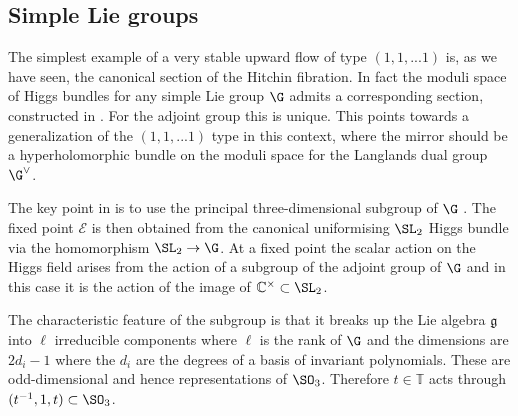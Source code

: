 \documentclass[12pt]{article}
\numberwithin{equation}{section}
\theoremstyle{remark}
\theoremstyle{definition}
\numberwithin{theorem}{section}
\newcommand{\lie}[1]{\mathfrak{#1}}
\def\C{\mathbb{C}}
\newcommand{\T}{{\mathbb{T}}}
\renewcommand{\1}{\mathbbm{1}}
\begin{document}
\subsection{Simple Lie groups}\label{simple}
The simplest example of a very stable upward flow of type $(1,1,...1)$ is, as we have seen, the canonical section of the Hitchin fibration. In fact  the moduli space of Higgs bundles for any simple Lie group $\G$ admits   a corresponding section, constructed in \cite{hitchin-lie}. For the adjoint group this is unique. This points towards a generalization of the $(1,1,...1)$ type in this context, where the mirror should be a hyperholomorphic bundle on the moduli space for the Langlands dual group $\G^{\vee}$.

The key point in \cite{hitchin-lie} is to use the principal three-dimensional subgroup of $\G$ \cite{Kos}. The fixed point $\mathcal E$ is then obtained from the canonical uniformising $\SL_2$ Higgs bundle  via the homomorphism $\SL_2\rightarrow \G$. At a fixed point  the scalar action on the Higgs field arises from the action of a subgroup of the adjoint  group of  $\G$ and in this case it is the  action of the image of $\C^\times\subset \SL_2$. 

The characteristic feature of the subgroup is that it breaks up the Lie algebra $\lie{g}$ into $\ell$ irreducible components where $\ell$ is the rank of $\G$ and the dimensions are $2d_i-1$ where the $d_i$ are the degrees of a basis of invariant polynomials. These are odd-dimensional and hence representations of $\SO_3$. Therefore $t   \in \T$ acts through $(t^{-1},1,t)\subset \SO_3$.
\end{document}
